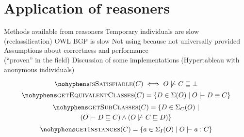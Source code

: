\documentclass[paper.tex]{subfiles}
\begin{document}
\section{Application of reasoners}
\label{sec:reasoners}

\begin{todos}
  \todo Methods available from reasoners
  \todo Temporary individuals are slow (reclassification)
  \todo OWL BGP is slow
  \todo Not using  because not universally provided
  \todo Assumptions about correctness and performance \\(``proven'' in the field)
  \todo Discussion of some implementations (Hypertableau with anonymous individuals)
\end{todos}

\todo[in ontology $O$]

\[ \textproc{isSatisfiable}(C) \iff O \not\sementails C \sqsubseteq \bot \]
\[ \textproc{getEquivalentClasses}(C) = \{ D \in \signature(O) \mid O \sementails D \equiv C \} \]
\begin{multline*}
  \textproc{getSubClasses}(C) =
  \{
    D \in \signature_C(O)
  \mid \\
    (O \sementails D \sqsubseteq C) \land (O \not\sementails C \sqsubseteq D)
  \}
\end{multline*}
\[ \textproc{getInstances}(C) = \{ a \in \signature_I(O) \mid O \sementails a : C \} \]
\end{document}
